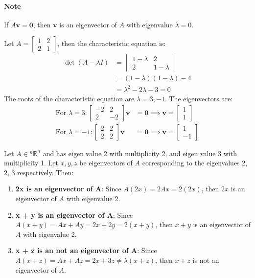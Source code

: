 \documentclass[11pt]{article}
\begin{document}
\paragraph{Note} If $A\textbf{v} = \textbf{0}$, then $\textbf{v}$ is an eigenvector of $A$ with eigenvalue $\lambda = 0$.
\begin{example}
    Let $A = \begin{bmatrix} 1 & 2 \\ 2 & 1 \end{bmatrix}$, then the characteristic equation is:
    \begin{align*}
        \det(A - \lambda I) &= \begin{vmatrix} 1-\lambda & 2 \\ 2 & 1-\lambda \end{vmatrix} \\
        &= (1-\lambda)(1-\lambda) - 4 \\
        &= \lambda^2 - 2\lambda - 3 = 0
    \end{align*}
    The roots of the characteristic equation are $\lambda = 3, -1$. The eigenvectors are:
    \begin{align*}
        \text{For } \lambda = 3: \begin{bmatrix} -2 & 2 \\ 2 & -2 \end{bmatrix}\textbf{v} &= \textbf{0} \implies \textbf{v} = \begin{bmatrix} 1 \\ 1 \end{bmatrix} \\
        \text{For } \lambda = -1: \begin{bmatrix} 2 & 2 \\ 2 & 2 \end{bmatrix}\textbf{v} &= \textbf{0} \implies \textbf{v} = \begin{bmatrix} 1 \\ -1 \end{bmatrix}
    \end{align*}
\end{example}
\begin{example}
    Let $A \in {^n\mathbb{R}^n}$ and has eigen value 2 with multiplicity 2, and eigen value 3 with multiplicity 1. Let $x, y, z$ be eigenvectors of $A$ corresponding to the eigenvalues 2, 2, 3 respectively. Then:
    \begin{enumerate}
        \item \textbf{2x is an eigenvector of A}: Since $A(2x) = 2Ax = 2(2x)$, then $2x$ is an eigenvector of $A$ with eigenvalue 2.
        \item \textbf{x + y is an eigenvector of A}: Since $A(x + y) = Ax + Ay = 2x + 2y = 2(x + y)$, then $x + y$ is an eigenvector of $A$ with eigenvalue 2.
        \item \textbf{x + z is an not an eigenvector of A}: Since $A(x + z) = Ax + Az = 2x + 3z \neq \lambda(x + z)$, then $x + z$ is not an eigenvector of $A$.
    \end{enumerate}
\end{example}
\end{document}

